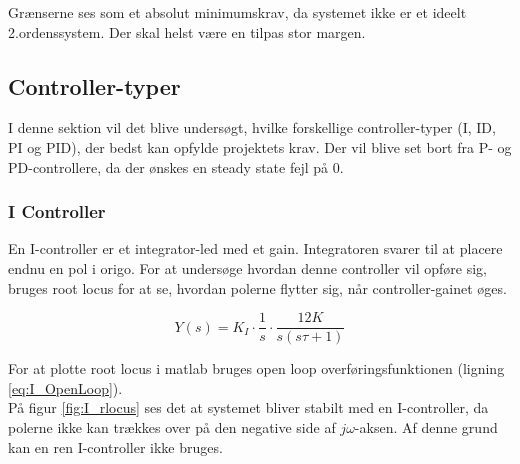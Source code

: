 Grænserne ses som et absolut minimumskrav, da systemet ikke er et ideelt 2.ordenssystem. Der skal helst være en tilpas stor margen.

\subsection{Controller-typer}

I denne sektion vil det blive undersøgt, hvilke forskellige controller-typer (I, ID, PI og PID), der bedst kan opfylde projektets krav. Der vil blive set bort fra P- og PD-controllere, da der ønskes en steady state fejl på 0. 

\subsubsection{I Controller}

En I-controller er et integrator-led med et gain. Integratoren svarer til at placere endnu en pol i origo. For at undersøge hvordan denne controller vil opføre sig, bruges root locus for at se, hvordan polerne flytter sig, når controller-gainet øges.

\begin{equation}\label{eq:I_OpenLoop}
Y(s)=K_{I}\cdot\frac{1}{s}\cdot\frac{12K}{s(s\tau+1)}
\end{equation}

For at plotte root locus i matlab bruges open loop overføringsfunktionen (ligning \ref{eq:I_OpenLoop}).\\ På figur \ref{fig:I_rlocus} ses det at systemet bliver stabilt med en I-controller, da polerne ikke kan trækkes over på den negative side af $j\omega$-aksen. Af denne grund kan en ren I-controller ikke bruges.

